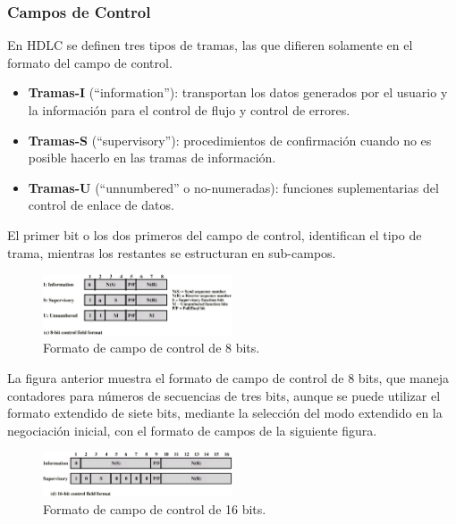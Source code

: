 \documentclass[withindex,glossary]{cam-thesis}
\begin{document}
\subsubsection{Campos de Control}
En HDLC se definen tres tipos de tramas, las que difieren solamente en el formato del campo de control.
\begin{itemize}
\item \textbf{Tramas-I} (“information”): transportan los datos generados por el usuario y la información para el control de flujo y control de errores.
\item \textbf{Tramas-S} (“supervisory”): procedimientos de confirmación cuando no es posible hacerlo en las tramas de información.
\item \textbf{Tramas-U} (“unnumbered” o no-numeradas): funciones suplementarias del control de enlace de datos.
\end{itemize}

El primer bit o los dos primeros del campo de control, identifican el tipo de trama, mientras los restantes se estructuran en sub-campos.

\begin{figure}[H]
\centering
\includegraphics[width=0.5\textwidth]{images/HDLC_8BitCtrlField}
\caption[Formato de campo de control de 8 bits]{Formato de campo de control de 8 bits.}
\end{figure}

La figura anterior muestra el formato de campo de control de 8 bits, que maneja contadores para números de secuencias de tres bits, aunque se puede utilizar el formato extendido de siete bits, mediante la selección del modo extendido en la negociación inicial, con el formato de campos de la siguiente figura.

\begin{figure}[H]
\centering
\includegraphics[width=0.5\textwidth]{images/HDLC_16BitCtrlField}
\caption[Formato de campo de control de 16 bits]{Formato de campo de control de 16 bits.}
\end{figure}
\end{document}
